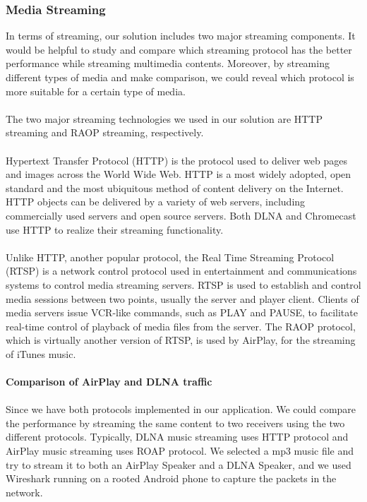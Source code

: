 \subsubsection{Media Streaming}
In terms of streaming, our solution includes two major streaming components. It would be helpful to study and compare which streaming protocol has the better performance while streaming multimedia contents. Moreover, by streaming different types of media and make comparison, we could reveal which protocol is more suitable for a certain type of media. \\
\\The two major streaming technologies we used in our solution are HTTP streaming and RAOP streaming, respectively.\\
\\
Hypertext Transfer Protocol (HTTP) is the protocol used to deliver web pages and images across the World Wide Web. HTTP is a most widely adopted, open standard and the most ubiquitous method of content delivery on the Internet. HTTP objects can be delivered by a variety of web servers, including commercially used servers and open source servers. Both DLNA and Chromecast use HTTP to realize their streaming functionality.\\
\\
Unlike HTTP, another popular protocol, the Real Time Streaming Protocol (RTSP) is a network control protocol used in entertainment and communications systems to control media streaming servers. RTSP is used to establish and control media sessions between two points, usually the server and player client. Clients of media servers issue VCR-like commands, such as PLAY and PAUSE, to facilitate real-time control of playback of media files from the server.  The RAOP protocol, which is virtually another version of RTSP, is used by AirPlay, for the streaming of iTunes music.\\
\\
\textbf{Comparison of AirPlay and DLNA traffic}\\
\\
Since we have both protocols implemented in our application. We could
compare the performance by streaming the same content to two receivers using the
two different protocols. Typically, DLNA music streaming uses HTTP protocol and
AirPlay music streaming uses ROAP protocol. We selected a mp3 music file and try to stream it to both an AirPlay Speaker and a DLNA Speaker, and we used Wireshark running on a rooted Android phone to capture the packets in the network.
